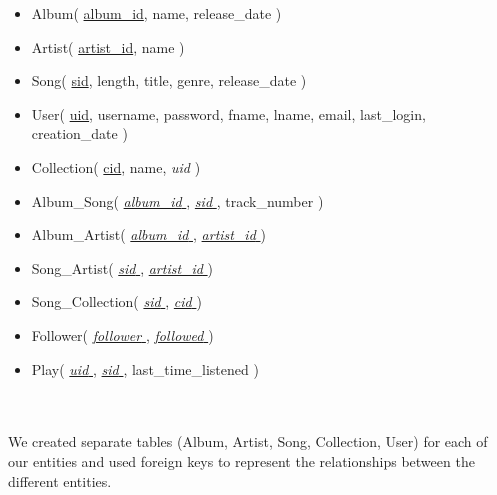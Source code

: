 \documentclass[12pt]{article}
\begin{document}
    \begin{itemize}
        \item Album( \underline{album\_id}, name, release\_date )
        \item Artist( \underline{artist\_id}, name )
        \item Song( \underline{sid}, length, title, genre, release\_date )
        \item User( \underline{uid}, username, password, fname, lname, email, last\_login, creation\_date )
        \item Collection( \underline{cid}, name, \emph{uid} )
        \item Album\_Song( \underline{ \emph{album\_id} }, \underline{ \emph{sid} }, track\_number )
        \item Album\_Artist( \underline{ \emph{album\_id} }, \underline{ \emph{artist\_id} } )
        \item Song\_Artist( \underline{ \emph{sid} }, \underline{ \emph{artist\_id} } )
        \item Song\_Collection( \underline{ \emph{sid} }, \underline{ \emph{cid} } )
        \item Follower( \underline{ \emph{follower} }, \underline{ \emph{followed} } )
        \item Play( \underline{ \emph{uid} }, \underline{ \emph{sid} }, last\_time\_listened )
    \end{itemize}
    \\~\\
    We created separate tables (Album, Artist, Song, Collection, User) for each of our
    entities and used foreign keys to represent the relationships between the different entities.
\end{document}

